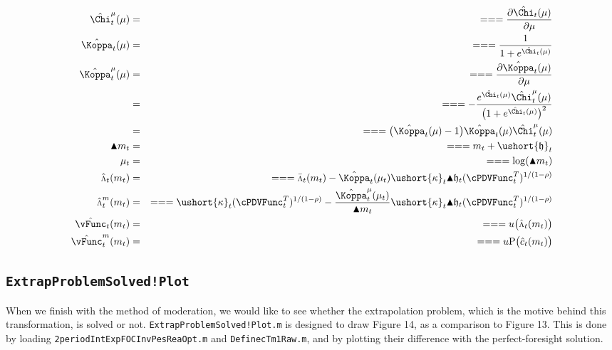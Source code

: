 \documentclass[titlepage,abstract]{\econtex}
\providecommand{\vInv}{\ensuremath{\scriptstyle \Lambda \displaystyle}}
\begin{document}
\begin{itemize}
            \begin{equation}\begin{gathered}\begin{aligned}
            \hat{\Chi}^{\mu}_{t}(\mu)    &=& =  =  =  \frac{\partial \hat{\Chi}_{t}(\mu)}{\partial \mu} \\
            \hat{\Koppa}_{t} (\mu)    &=& =  =  =  \frac{1}{1+e^{\hat{\Chi}_{t}(\mu)}} \\
            \hat{\Koppa}^{\mu}_{t} (\mu)    &=& =  =  =  \frac{\partial \hat{\Koppa}_{t} (\mu)}{\partial \mu} \\
               &=& =  =  =  -\frac{e^{\hat{\Chi}_{t}(\mu)} \hat{\Chi}^{\mu}_{t}(\mu)}{\big(1+e^{\hat{\Chi}_{t}(\mu)}\big)^{2}} \\
               &=& =  =  =  \big(\hat{\Koppa}_{t} (\mu)-1\big)\hat{\Koppa}_{t} (\mu) \hat{\Chi}^{\mu}_{t}(\mu) \\
            \blacktriangle m_{t}    &=& =  =  =  m_{t} + \ushort{\mathfrak{h}}_{t} \\
            \mu_{t}    &=& =  =  =  \log(\blacktriangle m_{t}) \\
            \hat{\vInv}_{t} (m_{t})    &=& =  =  =  \bar{\vInv}_{t}(m_{t})-\hat{\Koppa}_{t} (\mu_{t}) \ushort{\kappa}_{t} \blacktriangle \mathfrak{h}_{t} (\cPDVFunc_{t}^{T})^{1/(1-\rho)} \\
            \hat{\vInv}_{t}^{m} (m_{t})    &=& =  =  =  \ushort{\kappa}_{t} (\cPDVFunc_{t}^{T})^{1/(1-\rho)}-\frac{\hat{\Koppa}_{t}^{\mu}(\mu_{t})}{\blacktriangle m_{t}} \ushort{\kappa}_{t} \blacktriangle \mathfrak{h}_{t} (\cPDVFunc_{t}^{T})^{1/(1-\rho)} \\
            \hat{\vFunc}_{t} (m_{t})    &=& =  =  =  u\big(\hat{\vInv}_{t}(m_{t})\big) \\
            \hat{\vFunc}_{t}^{m} (m_{t})    &=& =  =  =  u\text{P}\big(\hat{c}_{t}(m_{t})\big)
            \end{aligned}\end{gathered}\end{equation}
\end{itemize}

\subsection{\texttt{ExtrapProblemSolved!Plot}}

When we finish with the method of moderation, we would like to see whether the extrapolation problem, which is the motive behind this transformation, is solved or not. \texttt{ExtrapProblemSolved!Plot.m} is designed to draw Figure 14, as a comparison to Figure 13. This is done by loading \texttt{2periodIntExpFOCInvPesReaOpt.m} and \texttt{DefinecTm1Raw.m}, and by plotting their difference with the perfect-foresight solution.
\end{document}

